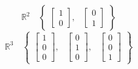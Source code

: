 \documentclass[12 pt]{slides}
\begin{document}
\begingroup
\[\mathbb{R}^2\quad \begin{Bmatrix}\begin{bmatrix}1\\0\end{bmatrix}, & 
\begin{bmatrix}0\\1\end{bmatrix} \end{Bmatrix}\]
\endgroup
\begingroup
\[\mathbb{R}^3\quad \begin{Bmatrix}\begin{bmatrix}1\\0\\0\end{bmatrix}, & 
\begin{bmatrix}0\\1\\0\end{bmatrix}, & \begin{bmatrix}0\\0\\1\end{bmatrix} 
\end{Bmatrix}\]
\endgroup
\end{document}
